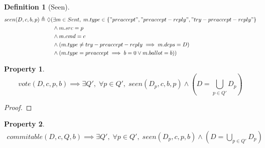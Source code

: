 \documentclass[a4paper]{article}
\theoremstyle{definition}
\newtheorem{definition}{Definition}
\theoremstyle{plain}
\newtheorem{property}{Property}
\begin{document}
\begin{definition}[Seen]
\begin{align*}
    seen(D,c,b,p) \triangleq \lozenge(& \exists m \in Sent, \; m.type \in \{"preaccept", "preaccept-reply", "try-preaccept-reply"\} \\
                                    &\wedge m.src = p \\
                                    &\wedge m.cmd = c \\
                                    &\wedge (m.type \neq try-preaccept-reply \implies m.deps = D) \\
                                    &\wedge (m.type = preaccept \implies b = 0 \vee m.ballot = b))
\end{align*}
\end{definition}

\begin{property}
\begin{equation*}
    vote(D,c,p,b) \implies \exists Q', \; \forall p \in Q', \; seen(D_p,c,b,p) \wedge (D = \bigcup_{p \in Q'}{D_p})
\end{equation*}
\end{property}

\begin{proof}
\end{proof}



\begin{property}
    \begin{align*}
    commitable(D,c,Q,b) \implies \exists Q', \; \forall p \in Q', \; seen(D_p,c,p,b) \wedge (D = \bigcup_{p \in Q'}{D_p})
    \end{align*}
\end{property}
\end{document}
